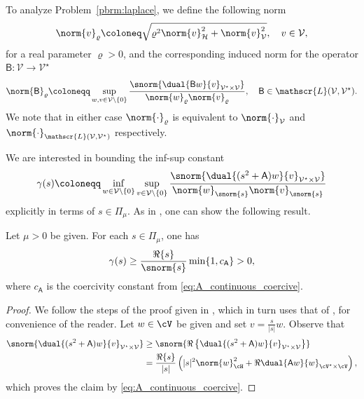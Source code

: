 
To analyze Problem~\ref{pbrm:laplace}, we define the following norm
\begin{equation}
	\norm{v}_{\varrho}
	\coloneq
	\sqrt{
		\varrho^2
		\norm{v}^2_{\mathcal{H}}
		+
		\norm{v}^2_{\mathcal{V}}
	},
	\quad
	v \in \mathcal{V},
\end{equation}
for a real parameter $\varrho>0$,
and the corresponding induced norm for the operator $\mathsf{B}:\mathcal{V} \rightarrow \mathcal{V}^\star $
\begin{equation}\label{eq:operator_norm_rho}
	\norm{\mathsf{B}}_{\varrho}
	\coloneqq
	\sup_{w,v \in \mathcal{V} \backslash \{0\}}
	\frac{
		\snorm{\dual{\mathsf{B}w}{v}_{\mathcal{V}^\star \times \mathcal{V}}}
	}{   
		\norm{w}_{\varrho}\norm{v}_{\varrho}
	},
	\quad
	\mathsf{B} \in \mathscr{L}(\mathcal{V},\mathcal{V}^\star).
\end{equation}
We note that in either case $\norm{\cdot}_\varrho$ is equivalent to $\norm{\cdot}_{\mathcal{V}}$ and 
$\norm{\cdot}_{\mathscr{L}(\mathcal{V},\mathcal{V}^\star)}$ respectively.
 
We are interested in bounding the inf-sup constant
\begin{equation}
	\gamma(s)
	\coloneqq
	\inf_{w \in \mathcal{V} \backslash \{0\}}
	\sup_{v\in  \mathcal{V} \backslash \{0\}}
	\frac{
		\snorm{
			\dual{(s^2+\mathsf{A})w}{v}_{\mathcal{V}^\star \times \mathcal{V}}
		}
	}{
		\norm{w}_{\snorm{s}}
		\norm{v}_{\snorm{s}}
	}
\end{equation}
explicitly in terms of $s \in \Pi_\mu$.
As in \cite{MST20}, one can show the following result.

\begin{lemma}\label{lmm:inf_sup}
Let $\mu>0$ be given. For each $s \in \Pi_\mu$, one has
\begin{equation}
	\gamma(s)
	\geq
	\frac{
		{\Re\{s\}}
	}{
		\snorm{s} 	}
    \min\{1, c_{\mathsf{A}}\}
    >0,
\end{equation}
where $c_{\mathsf{A}}$ is the coercivity constant from \eqref{eq:A_continuous_coercive}.
\end{lemma}
\begin{proof}
We follow the steps of the proof given in \cite{MST20}, which in turn uses that of \cite{HBN86},
for convenience of the reader.
Let $w\in\cV$ be given and set $v=\frac{s}{|s|}w$. Observe that
\begin{equation}
\begin{aligned}
	\snorm{\dual{(s^2+\mathsf{A})w}{v}_{\mathcal{V}^\star \times \mathcal{V}}}
	&
	\geq
	\snorm{\Re\left\{\dual{(s^2+\mathsf{A}) w}{v}_{\mathcal{V}^\star \times \mathcal{V}}\right\}}
	\\
	&
	=
	\frac{{\Re\{s\}}}{|s|}\left(|s|^2\norm{w}_\cH^2+\Re\dual{\mathsf{A}w}{w}_{\cV^\star\times\cV}\right),
\end{aligned}
\end{equation}
which proves the claim by \eqref{eq:A_continuous_coercive}.
\end{proof}

